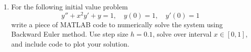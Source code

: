 \documentclass[letterpaper, fontsize=12pt]{scrartcl} %
\numberwithin{equation}{section} %
\numberwithin{figure}{section} %
\numberwithin{table}{section} %
\begin{document}
\begin{enumerate}
\begin{enumerate}
\begin{enumerate}[label=(\roman*)]
\end{enumerate}


\item For the following initial value problem
\[ y'' + x^2y' + y = 1,\quad y(0) = 1, \quad y'(0) = 1 \]
write a piece of MATLAB code to numerically solve the system using Backward Euler method. Use step size $h = 0.1$, solve over interval $x \in [0,1]$, and include code to plot your solution. 

%
%

\end{enumerate}
\end{enumerate}
\end{document}
